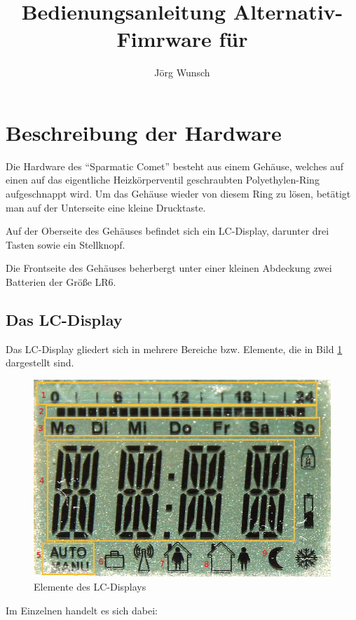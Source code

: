\documentclass[a4paper]{article}
\title {
Bedienungsanleitung Alternativ-Fimrware für \SC
}
\author {
\sf Jörg Wunsch
}
\newcommand\SC{"`Sparmatic Comet"' }
\begin{document}
\maketitle


\section {
Beschreibung der Hardware
}

Die Hardware des \SC besteht aus einem Gehäuse, welches auf einen auf
das eigentliche Heizkörperventil geschraubten Polyethylen-Ring
aufgeschnappt wird.  Um das Gehäuse wieder von diesem Ring zu lösen,
betätigt man auf der Unterseite eine kleine Drucktaste.

Auf der Oberseite des Gehäuses befindet sich ein LC-Display, darunter
drei Tasten sowie ein Stellknopf.

Die Frontseite des Gehäuses beherbergt unter einer kleinen Abdeckung zwei
Batterien der Größe LR6.

\subsection {
  Das LC-Display
}

Das LC-Display gliedert sich in mehrere Bereiche bzw. Elemente, die in
Bild \ref{LCD} dargestellt sind.

\begin{figure}[h]
\centering\includegraphics[width=0.5\linewidth]{LCD.jpg}
\caption{Elemente des LC-Displays}
\label{LCD}
\end{figure}

Im Einzelnen handelt es sich dabei:
\end{document}
